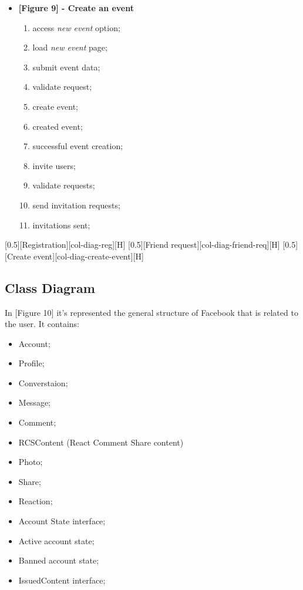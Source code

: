 \documentclass{article}
\begin{document}
\begin{itemize}
				\item \textbf{[Figure 9] - Create an event}
				\begin{enumerate}
					\item access \textit{new event} option;
					\item load \textit{new event} page;
					\item submit event data;
					\item validate request;
					\item create event;
					\item created event;
					\item successful event creation;
					\item invite users;
					\item validate requests;
					\item send invitation requests;
					\item invitations sent;
				\end{enumerate}
			\end{itemize}

			[0.5][Registration][col-diag-reg][H]
			[0.5][Friend request][col-diag-friend-req][H]
			[0.5][Create event][col-diag-create-event][H]

		\subsection{Class Diagram}
			In [Figure 10] it's represented the general structure of Facebook that is related to the user. It contains:
			\begin{itemize}
				\item Account;
				\item Profile;
				\item Converstaion;
				\item Message;
				\item Comment;
				\item RCSContent (React Comment Share content)
				\item Photo;
				\item Share;
				\item Reaction;
				\item Account State interface;
				\item Active account state;
				\item Banned account state;
				\item IssuedContent interface;
			\end{itemize}
\end{document}
